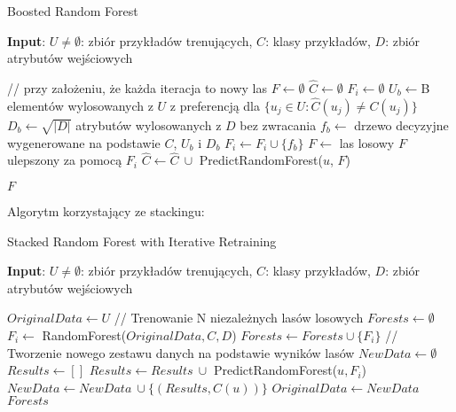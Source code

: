 \documentclass[10pt,a4paper]{article}
\begin{document}
\begin{algorithm}[h]
	\caption{Boosted Random Forest}\label{alg:caprf_train}
	\hspace*{\algorithmicindent} \textbf{Input}: $U\neq \emptyset$: zbiór przykładów trenujących, $C$: klasy przykładów, $D$: zbiór atrybutów wejściowych
\begin{algorithmic}
	\State 	// przy założeniu, że każda iteracja to nowy las
	\State $F \gets \emptyset$
	\State $\hat C \gets \emptyset$
		\State $F_i \gets \emptyset$
			\State $U_b \gets $B elementów wylosowanych z $U$ z preferencją dla $\{u_j \in U: \hat C(u_j) \neq C(u_j)\}$
			\State $D_b \gets \sqrt{|D|} $ atrybutów wylosowanych z $D$ bez zwracania
			\State $f_b \gets $ drzewo decyzyjne wygenerowane na podstawie $C$, $U_b$ i $D_b$
			\State $F_i \gets F_i \cup \{f_b\}$
		\EndFor
		\State $F \gets $ las losowy $F$ ulepszony za pomocą $F_i$
			\State $\hat C \gets \hat C\ \cup$ PredictRandomForest($u$, $F$)
		\EndFor
		
	\EndFor
	\State \Return $F$
\end{algorithmic}
\end{algorithm}

Algorytm korzystający ze stackingu:


\begin{algorithm}[H]
    \caption{Stacked Random Forest with Iterative Retraining}\label{alg:iterative_stacked_rf}
    \hspace*{\algorithmicindent} \textbf{Input}: $U\neq \emptyset$: zbiór przykładów trenujących, $C$: klasy przykładów, $D$: zbiór atrybutów wejściowych
    \begin{algorithmic}
        \State $OriginalData \gets U$
            \State // Trenowanie N niezależnych lasów losowych
            \State $Forests \gets \emptyset$
                \State $F_i \gets $ RandomForest($OriginalData, C, D$)
                \State $Forests \gets Forests \cup \{F_i\}$
            \EndFor
            \State // Tworzenie nowego zestawu danych na podstawie wyników lasów
            \State $NewData \gets \emptyset$
                \State $Results \gets []$
                    \State $Results \gets Results\ \cup$ PredictRandomForest($u, F_i$)
                \EndFor
                \State $NewData \gets NewData\ \cup \{(Results, C(u))\}$
            \EndFor
            \State $OriginalData \gets NewData$
        \EndFor
        \State \Return $Forests$
    \end{algorithmic}
\end{algorithm}
\end{document}
